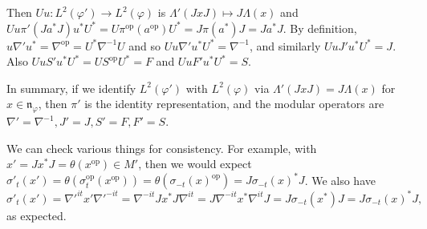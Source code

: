 \documentclass[a4paper,11pt]{article}
\theoremstyle{plain}
\theoremstyle{remark}
\newcommand{\mf}[1]{\mathfrak{#1}}
\newcommand{\op}{{\operatorname{op}}}
\begin{document}
Then $Uu \colon L^2(\varphi') \to L^2(\varphi)$ is $\Lambda'(JxJ) \mapsto J\Lambda(x)$ and $Uu\pi'(Ja^*J)u^*U^* = U \pi^\op(a^\op) U^* = J\pi(a^*)J = Ja^*J$.  By definition, $u \nabla' u^* = \nabla^\op = U^*\nabla^{-1}U$ and so $Uu \nabla' u^*U^* = \nabla^{-1}$, and similarly $Uu J' u^*U^* = J$.  Also $Uu S' u^*U^* = US^\op U^* = F$ and $Uu F' u^*U^* = S$.

In summary, if we identify $L^2(\varphi')$ with $L^2(\varphi)$ via $\Lambda'(JxJ) = J\Lambda(x)$ for $x\in\mf n_\varphi$, then $\pi'$ is the identity representation, and the modular operators are $\nabla' = \nabla^{-1}, J' = J, S' = F, F' = S$.

We can check various things for consistency.  For example, with $x' = Jx^*J  = \theta(x^\op) \in M'$, then we would expect $\sigma'_t(x') = \theta(\sigma^\op_t(x^\op)) = \theta(\sigma_{-t}(x)^\op) = J \sigma_{-t}(x)^* J$.  We also have
\[ \sigma'_t(x')
= \nabla'^{it} x' \nabla'^{-it}
= \nabla^{-it} Jx^*J \nabla^{it}
= J \nabla^{-it} x^* \nabla^{it} J
= J \sigma_{-t}(x^*) J
= J \sigma_{-t}(x)^* J, \]
as expected.



\end{document}
